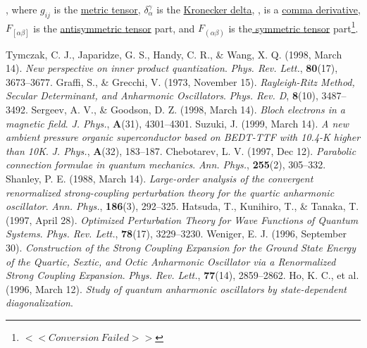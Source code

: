 \documentclass{article}
\begin{document}
\noindent \cite{Misner}, where $g_{i j}$ is the \href{http://mathworld.wolfram.com/MetricTensor.html}{metric
tensor}, $\delta _{\alpha }^{\gamma }$ is the \href{http://mathworld.wolfram.com/KroneckerDelta.html}{Kronecker
delta}, , is a \href{http://mathworld.wolfram.com/CommaDerivative.html}{comma
derivative}, $F_{[\alpha \beta ]}$ is the \href{http://mathworld.wolfram.com/AntisymmetricTensor.html}{antisymmetric
tensor} part, and $F_{(\alpha \beta )}$ is the\href{http://mathworld.wolfram.com/SymmetricTensor.html}{
symmetric tensor} part\footnote{$ <<Conversion\ Failed>>%
 $}.\label{foot}\label{mww}\label{seealsos}
\begin{thebibliography}{000}
 Tymczak, C. J., Japaridze, G. S., Handy, C. R.,
\& Wang, X. Q. (1998, March 14). \textit{New perspective on inner
product quantization}. \textit{Phys. Rev. Lett.}, \textbf{80}(17),
3673--3677.\label{Tymczak}
 Graffi, S., \& Grecchi, V. (1973, November 15).
\textit{Rayleigh-Ritz Method, Secular Determinant, and Anharmonic
Oscillators}. \textit{Phys. Rev. D}, \textbf{8}(10), 3487--3492.\label{Graffi}
 Sergeev, A. V., \& Goodson, D. Z. (1998, March
14). \textit{Bloch electrons in a magnetic field}. \textit{J. Phys.},
\textbf{A}(31), 4301--4301.\label{Sergeev}
 Suzuki, J. (1999, March 14). \textit{A new ambient
pressure organic superconductor based on BEDT-TTF with 10.4-K higher
than 10K}. \textit{J. Phys.}, \textbf{A}(32), 183--187.\label{Suzuki}
 Chebotarev, L. V. (1997, Dec 12). \textit{Parabolic
connection formulae in quantum mechanics}. \textit{Ann. Phys.},
\textbf{255}(2), 305--332.\label{Chebot}
 Shanley, P. E. (1988, March 14). \textit{Large-order
analysis of the convergent renormalized strong-coupling perturbation
theory for the quartic anharmonic oscillator}. \textit{Ann. Phys.},
\textbf{186}(3), 292--325.\label{Shanley}
 Hatsuda, T., Kunihiro, T., \& Tanaka, T. (1997,
April 28). \textit{Optimized Perturbation Theory for Wave Functions
of Quantum Systems}. \textit{Phys. Rev. Lett.}, \textbf{78}(17),
3229--3230.\label{Hatsuda}
 Weniger, E. J. (1996, September 30). \textit{Construction
of the Strong Coupling Expansion for the Ground State Energy of
the Quartic, Sextic, and Octic Anharmonic Oscillator via a Renormalized
Strong Coupling Expansion}. \textit{Phys. Rev. Lett.}, \textbf{77}(14),
2859--2862.\label{Weniger}
 Ho, K. C., et al. (1996, March 12). \textit{Study
of quantum anharmonic oscillators by state-dependent diagonalization}.

\end{thebibliography}
\end{document}
